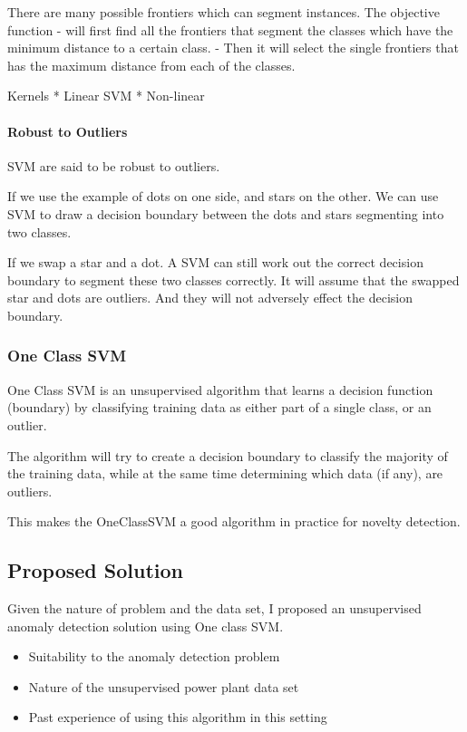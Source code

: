 \documentclass[11pt]{article}
\providecommand{\tightlist}{%
      \setlength{\itemsep}{0pt}\setlength{\parskip}{0pt}}
\begin{document}
There are many possible frontiers which can segment instances. The
objective function - will first find all the frontiers that segment the
classes which have the minimum distance to a certain class. - Then it
will select the single frontiers that has the maximum distance from each
of the classes.

Kernels * Linear SVM * Non-linear

\paragraph{Robust to Outliers}\label{robust-to-outliers}

SVM are said to be robust to outliers.

If we use the example of dots on one side, and stars on the other. We
can use SVM to draw a decision boundary between the dots and stars
segmenting into two classes.

If we swap a star and a dot. A SVM can still work out the correct
decision boundary to segment these two classes correctly. It will assume
that the swapped star and dots are outliers. And they will not adversely
effect the decision boundary.

\subsubsection{One Class SVM}\label{one-class-svm}

One Class SVM is an unsupervised algorithm that learns a decision
function (boundary) by classifying training data as either part of a
single class, or an outlier.

The algorithm will try to create a decision boundary to classify the
majority of the training data, while at the same time determining which
data (if any), are outliers.

This makes the OneClassSVM a good algorithm in practice for novelty
detection.

    \subsection{Proposed Solution}\label{proposed-solution}

Given the nature of problem and the data set, I proposed an unsupervised
anomaly detection solution using One class SVM.

\begin{itemize}
\tightlist
\item
  Suitability to the anomaly detection problem
\item
  Nature of the unsupervised power plant data set
\item
  Past experience of using this algorithm in this setting
\end{itemize}
\end{document}
